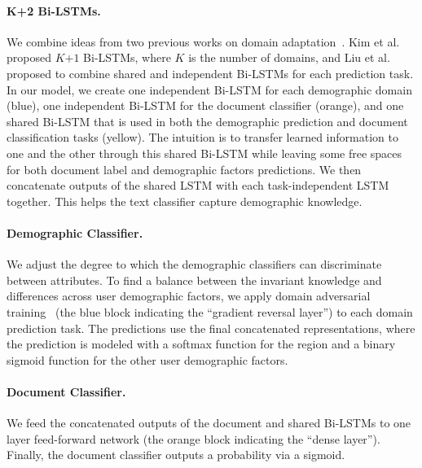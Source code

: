 \paragraph{K+2 Bi-LSTMs.} We combine ideas from two previous works on domain adaptation~\cite{liu2017adversarial, kim2017domain}. Kim et al.~\cite{kim2017domain} proposed $K$$+$$1$ Bi-LSTMs, where $K$ is the number of domains, and Liu et al.~\cite{liu2017adversarial} proposed to combine shared and independent Bi-LSTMs for each prediction task. In our model, we create one independent Bi-LSTM for each demographic domain (blue), one independent Bi-LSTM for the document classifier (orange), and one shared Bi-LSTM that is used in both the demographic prediction and document classification tasks (yellow). The intuition is to transfer learned information to one and the other through this shared Bi-LSTM while leaving some free spaces for both document label and demographic factors predictions. We then concatenate outputs of the shared LSTM with each task-independent LSTM together. This helps the text classifier capture demographic knowledge.

\paragraph{Demographic Classifier.} 
We adjust the degree to which the demographic classifiers can discriminate between attributes. 
To find a balance between the invariant knowledge and differences across user demographic factors, we apply domain adversarial training~\cite{ganin2016domain} (the blue block indicating the ``gradient reversal layer'') to each domain prediction task. The predictions use the final concatenated representations, where the prediction is modeled with a {softmax} function for the region and a binary {sigmoid} function for the other user demographic factors. 

\paragraph{Document Classifier.} We feed the concatenated outputs of the document and shared Bi-LSTMs to one layer feed-forward network (the orange block indicating the ``dense layer''). Finally, the document classifier outputs a probability via a sigmoid.

